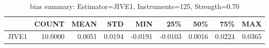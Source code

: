 \begin{table}[ht]
\centering
\caption{bias summary: Estimator=JIVE1, Instruments=125, Strength=0.70}
\begin{tabular}{lrrrrrrrr}
\toprule
 & COUNT & MEAN & STD & MIN & 25\% & 50\% & 75\% & MAX \\
\midrule
JIVE1 & 10.0000 & 0.0051 & 0.0194 & -0.0191 & -0.0103 & 0.0016 & 0.0224 & 0.0365 \\
\bottomrule
\end{tabular}
\end{table}
